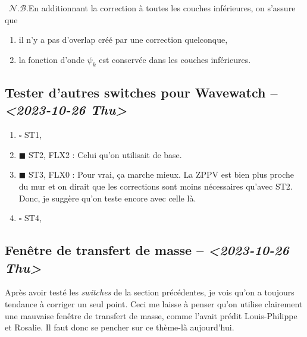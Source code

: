 \documentclass[10pt]{article}
\numberwithin{equation}{section}
\renewcommand{\boxtimes}{\blacksquare}
\newcommand{\nb}{\raisebox{0.8pt}{\scriptsize\textleaf}\ $\mathscr{N. B.}$\hspace{4pt}}
\begin{document}
\nb En additionnant la correction à toutes les couches inférieures, on s'assure que 
\begin{enumerate}
\item il n'y a pas d'overlap créé par une correction quelconque,
\item la fonction d'onde \(\psi_k\) est conservée dans les couches inférieures.
\end{enumerate}



\subsection{Tester d'autres switches pour Wavewatch -- \textit{<2023-10-26 Thu>}}
\label{sec:orgd15d0e2}
\label{org2652828}
\begin{enumerate}
\item{$\square$} ST1,
\item{$\boxtimes$} ST2, FLX2 : Celui qu'on utilisait de base.
\item{$\boxtimes$} ST3, FLX0 : Pour vrai, ça marche mieux. La ZPPV est bien plus proche du mur et on dirait que les corrections sont moins nécessaires qu'avec ST2.
Donc, je suggère qu'on teste encore avec celle là.
\item{$\square$} ST4, \bigskip
\end{enumerate}


\subsection{Fenêtre de transfert de masse -- \textit{<2023-10-26 Thu>}}
\label{sec:org5980299}
Après avoir testé les \emph{switches} de la section précédentes, je vois qu'on a toujours tendance à corriger un seul point.
Ceci me laisse à penser qu'on utilise clairement une mauvaise fenêtre de transfert de masse, comme l'avait prédit Louis-Philippe et Rosalie.
Il faut donc se pencher sur ce thème-là aujourd'hui.



\end{document}
